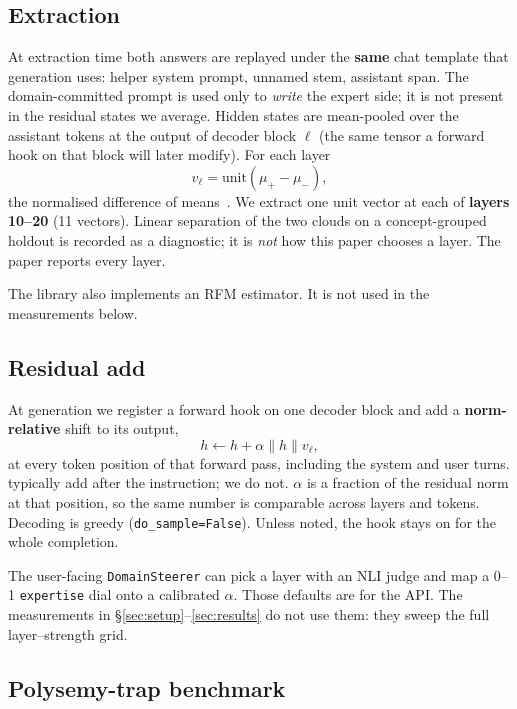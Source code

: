 \documentclass{article} %
\begin{document}
\subsection{Extraction}

At extraction time both answers are replayed under the \textbf{same} chat template that generation uses: helper system prompt, unnamed stem, assistant span.
The domain-committed prompt is used only to \emph{write} the expert side; it is not present in the residual states we average.
Hidden states are mean-pooled over the assistant tokens at the output of decoder block $\ell$ (the same tensor a forward hook on that block will later modify).
For each layer
\begin{equation}
v_\ell = \mathrm{unit}(\mu_+ - \mu_-),
\end{equation}
the normalised difference of means~\citep{rimsky2024caa}.
We extract one unit vector at each of \textbf{layers 10--20} (11 vectors).
Linear separation of the two clouds on a concept-grouped holdout is recorded as a diagnostic; it is \emph{not} how this paper chooses a layer.
The paper reports every layer.

The library also implements an RFM estimator.
It is not used in the measurements below.

\subsection{Residual add}

At generation we register a forward hook on one decoder block and add a \textbf{norm-relative} shift to its output,
\begin{equation}
h \leftarrow h + \alpha \|h\| v_\ell,
\end{equation}
at every token position of that forward pass, including the system and user turns.
\citet{rimsky2024caa} typically add after the instruction; we do not.
$\alpha$ is a fraction of the residual norm at that position, so the same number is comparable across layers and tokens.
Decoding is greedy (\texttt{do\_sample=False}).
Unless noted, the hook stays on for the whole completion.

The user-facing \texttt{DomainSteerer} can pick a layer with an NLI judge and map a 0--1 \texttt{expertise} dial onto a calibrated $\alpha$.
Those defaults are for the API.
The measurements in \S\ref{sec:setup}--\ref{sec:results} do not use them: they sweep the full layer--strength grid.

\subsection{Polysemy-trap benchmark}
\label{sec:benchmark}
\end{document}
